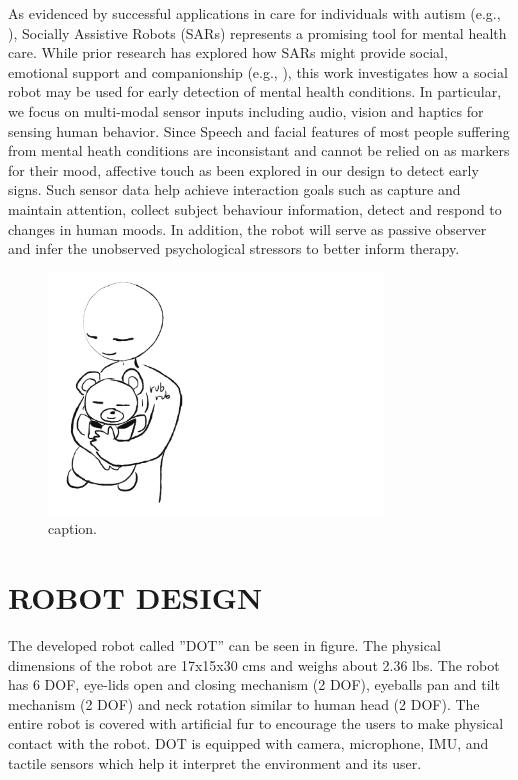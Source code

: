 \documentclass[letterpaper, 10 pt, conference]{ieeeconf}  %
\begin{document}
As evidenced by successful applications in care for individuals with autism (e.g., \cite{sc1}), Socially Assistive Robots (SARs) \cite{S1} represents a promising tool for mental health care. 
While prior research has explored how SARs might provide social, emotional support and companionship (e.g., \cite{p1}), 
this work investigates how a social robot may be used for early detection of mental health conditions. In particular, we focus on multi-modal sensor inputs including audio, vision and haptics for sensing human behavior. Since Speech and facial features of most people suffering from mental heath conditions are inconsistant and cannot be relied on as markers for their mood, affective touch as been explored in our design to detect early signs. Such sensor data help achieve interaction goals such as capture and maintain attention, collect subject behaviour information, detect and respond to changes in human moods. In addition, the robot will serve as passive observer and infer the unobserved psychological stressors to better inform therapy.     








\begin{figure}[t!]
\centering
\includegraphics[width=3.5in]{teaser.pdf}
\vskip -10pt
\caption{caption.}
\label{fig:teaser}
\end{figure}

\section{ROBOT DESIGN}

The developed robot called ''DOT'' can be seen in figure. The physical dimensions of the robot are 17x15x30 cms and weighs about 2.36 lbs. The robot has 6 DOF, eye-lids open and closing mechanism (2 DOF), eyeballs pan and tilt mechanism (2 DOF) and neck rotation similar to human head (2 DOF). The entire robot is covered with artificial fur to encourage the users to make physical contact with the robot. DOT is equipped with camera, microphone, IMU, and tactile sensors which help it interpret the environment and its user.  
\end{document}
